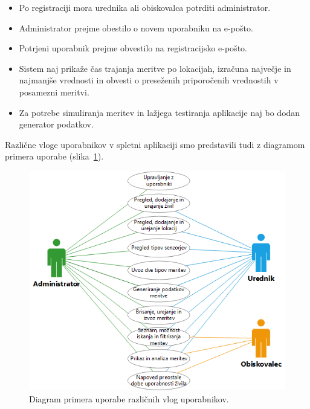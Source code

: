 \documentclass[a4paper, 12pt]{book}
\begin{document}
\begin{itemize}
\item Po registraciji mora urednika ali obiskovalca potrditi administrator.

\item Administrator prejme obestilo o novem uporabniku na e-pošto.

\item Potrjeni uporabnik prejme obvestilo na registracijsko e-pošto.

\item Sistem naj prikaže čas trajanja meritve po lokacijah, izračuna največje in najmanjše vrednosti in obvesti o preseženih priporočenih vrednostih v posamezni meritvi.

\item Za potrebe simuliranja meritev in lažjega testiranja aplikacije naj bo dodan generator podatkov.

\end{itemize}


Različne vloge uporabnikov v spletni aplikaciji smo predstavili tudi z diagramom primera uporabe (slika~\ref{diagram-uporabe-userjev}).

\begin{figure}[h]
\begin{center}
\includegraphics[width=\textwidth]{slike/Use-case-userjev.png}
\end{center}
\caption{Diagram primera uporabe različnih vlog uporabnikov.}
\label{diagram-uporabe-userjev}
\end{figure}
\end{document}
